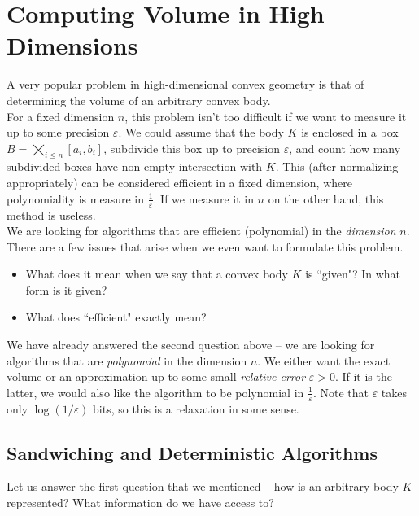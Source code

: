 
\section{Computing Volume in High Dimensions}

A very popular problem in high-dimensional convex geometry is that of determining the volume of an arbitrary convex body.\\

For a fixed dimension $n$, this problem isn't too difficult if we want to measure it up to some precision $\varepsilon$. We could assume that the body $K$ is enclosed in a box $B=\bigtimes_{i\leq n}[a_i,b_i]$, subdivide this box up to precision $\varepsilon$, and count how many subdivided boxes have non-empty intersection with $K$. This (after normalizing appropriately) can be considered efficient in a fixed dimension, where polynomiality is measure in $\frac{1}{\varepsilon}$. If we measure it in $n$ on the other hand, this method is useless.\\
We are looking for algorithms that are efficient (polynomial) in the \textit{dimension} $n$.\\

There are a few issues that arise when we even want to formulate this problem.
\begin{itemize}
	\item What does it mean when we say that a convex body $K$ is ``given"? In what form is it given?
	\item What does ``efficient" exactly mean?
\end{itemize}

We have already answered the second question above -- we are looking for algorithms that are \textit{polynomial} in the dimension $n$. We either want the exact volume or an approximation up to some small \textit{relative error} $\varepsilon>0$. If it is the latter, we would also like the algorithm to be polynomial in $\frac{1}{\varepsilon}$. Note that $\varepsilon$ takes only $\log(1/\varepsilon)$ bits, so this is a relaxation in some sense.

\subsection{Sandwiching and Deterministic Algorithms}
\label{subsec: sandwiching and deterministic algorithms}

Let us answer the first question that we mentioned -- how is an arbitrary body $K$ represented? What information do we have access to?

